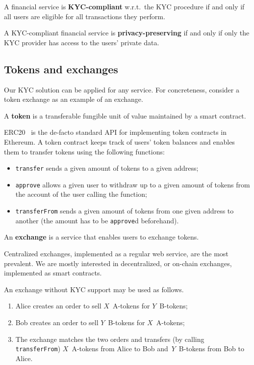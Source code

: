 \begin{definition}
	A financial service is \textbf{KYC-compliant} w.r.t.~the KYC procedure if and only if all users are eligible for all transactions they perform.
\end{definition}

\begin{definition}
	A KYC-compliant financial service is \textbf{privacy-preserving} if and only if only the KYC provider has access to the users' private data.
\end{definition}


\subsection{Tokens and exchanges}

Our KYC solution can be applied for any service.
For concreteness, consider a token exchange as an example of an exchange.

\begin{definition}
	A \textbf{token} is a transferable fungible unit of value maintained by a smart contract.
\end{definition}

ERC20~\cite{Victor2019} is the de-facto standard API for implementing token contracts in Ethereum.
A token contract keeps track of users' token balances and enables them to transfer tokens using the following functions:

\begin{itemize}
	\item \texttt{transfer} sends a given amount of tokens to a given address;
	\item \texttt{approve} allows a given user to withdraw up to a given amount of tokens from the account of the user calling the function;
	\item \texttt{transferFrom} sends a given amount of tokens from one given address to another (the amount has to be \texttt{approve}d beforehand).
\end{itemize}

\begin{definition}
	An \textbf{exchange} is a service that enables users to exchange tokens.
\end{definition}

Centralized exchanges, implemented as a regular web service, are the most prevalent.
We are mostly interested in decentralized, or on-chain exchanges, implemented as smart contracts.

An exchange without KYC support may be used as follows.
\begin{enumerate}
	\item Alice creates an order to sell $X$~A-tokens for $Y$~B-tokens;
	\item Bob creates an order to sell $Y$~B-tokens for $X$~A-tokens;
	\item The exchange matches the two orders and transfers (by calling \texttt{transferFrom}) $X$~A-tokens from Alice to Bob and~$Y$~B-tokens from Bob to Alice.
\end{enumerate}

